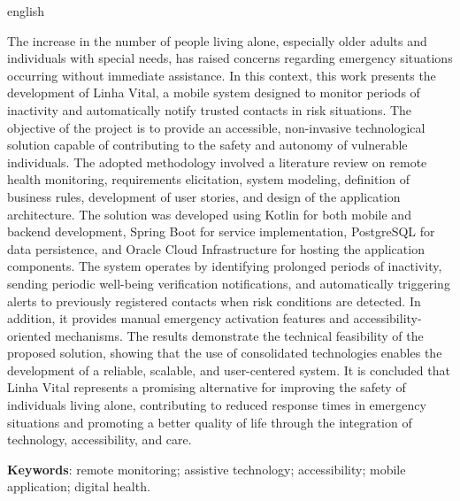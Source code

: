 \begin{resumo}[Abstract]
\begin{otherlanguage*}{english}

The increase in the number of people living alone, especially older adults and individuals with special needs, has raised concerns regarding emergency situations occurring without immediate assistance. In this context, this work presents the development of Linha Vital, a mobile system designed to monitor periods of inactivity and automatically notify trusted contacts in risk situations. The objective of the project is to provide an accessible, non-invasive technological solution capable of contributing to the safety and autonomy of vulnerable individuals. The adopted methodology involved a literature review on remote health monitoring, requirements elicitation, system modeling, definition of business rules, development of user stories, and design of the application architecture. The solution was developed using Kotlin for both mobile and backend development, Spring Boot for service implementation, PostgreSQL for data persistence, and Oracle Cloud Infrastructure for hosting the application components. The system operates by identifying prolonged periods of inactivity, sending periodic well-being verification notifications, and automatically triggering alerts to previously registered contacts when risk conditions are detected. In addition, it provides manual emergency activation features and accessibility-oriented mechanisms. The results demonstrate the technical feasibility of the proposed solution, showing that the use of consolidated technologies enables the development of a reliable, scalable, and user-centered system. It is concluded that Linha Vital represents a promising alternative for improving the safety of individuals living alone, contributing to reduced response times in emergency situations and promoting a better quality of life through the integration of technology, accessibility, and care.

\vspace{\onelineskip}
\noindent
\textbf{Keywords}: remote monitoring; assistive technology; accessibility; mobile application; digital health.

\end{otherlanguage*}
\end{resumo}


% 

%  
